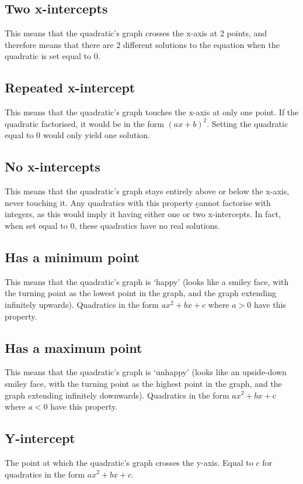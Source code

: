 \subsection{Two x-intercepts}
This means that the quadratic's graph crosses the x-axis at 2 points, and therefore means that there are 2 different solutions to the equation when the quadratic is set equal to 0.

\subsection{Repeated x-intercept}
This means that the quadratic's graph touches the x-axis at only one point. If the quadratic factorised, it would be in the form $(ax+b)^2$. Setting the quadratic equal to 0 would only yield one solution.

\subsection{No x-intercepts}
This means that the quadratic's graph stays entirely above or below the x-axis, never touching it. Any quadratics with this property \b{cannot} factorise with integers, as this would imply it having either one or two x-intercepts. In fact, when set equal to 0, these quadratics have no real solutions.

\subsection{Has a minimum point}
This means that the quadratic's graph is `happy' (looks like a smiley face, with the turning point as the lowest point in the graph, and the graph extending infinitely upwards). Quadratics in the form $ax^2+bx+c$ where $a>0$ have this property.

\subsection{Has a maximum point}
This means that the quadratic's graph is `unhappy' (looks like an upside-down smiley face, with the turning point as the highest point in the graph, and the graph extending infinitely downwards). Quadratics in the form $ax^2+bx+c$ where $a<0$ have this property.

\subsection{Y-intercept}
The point at which the quadratic's graph crosses the y-axis. Equal to $c$ for quadratics in the form $ax^2+bx+c$.